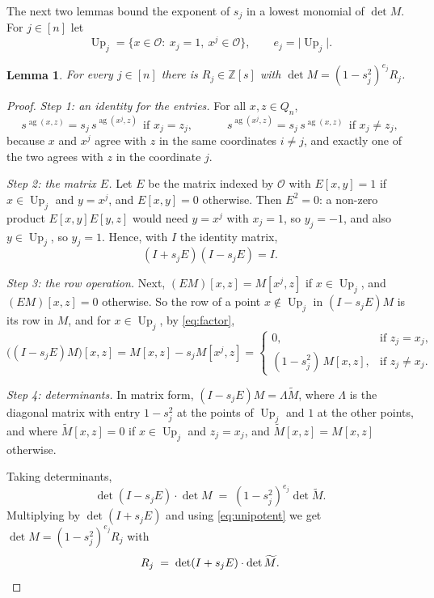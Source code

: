 \documentclass[11pt,reqno]{amsart}
\newtheorem{lemma}[theorem]{Lemma}
\theoremstyle{definition}
\theoremstyle{remark}
\numberwithin{equation}{section}
\theoremstyle{named}
\theoremstyle{plain}
\newcommand{\Z}{\mathbb{Z}}
\newcommand{\ag}{\operatorname{ag}}
\newcommand{\Up}{\operatorname{Up}}
\newcommand{\cO}{\mathcal{O}}
\newcommand{\abs}[1]{\lvert #1\rvert}
\begin{document}
The next two lemmas bound the exponent of $s_j$ in a lowest monomial of $\det M$. For $j\in[n]$ let
\[
   \Up_j=\{x\in\cO:\ x_j=1,\ x^{j}\in\cO\},\qquad e_j=\abs{\Up_j}.
\]

\begin{lemma}\label{lem:factor}
For every $j\in[n]$ there is $R_j\in\Z[s]$ with $\det M=(1-s_j^{2})^{e_j}R_j$.
\end{lemma}

\begin{proof}
\emph{Step 1: an identity for the entries.} For all $x,z\in Q_n$,
\begin{equation}\label{eq:factor}
   s^{\ag(x,z)}=s_j\,s^{\ag(x^{j},z)}\ \ \text{if }x_j=z_j,\qquad\quad
   s^{\ag(x^{j},z)}=s_j\,s^{\ag(x,z)}\ \ \text{if }x_j\ne z_j ,
\end{equation}
because $x$ and $x^{j}$ agree with $z$ in the same coordinates $i\ne j$, and exactly one of the two
agrees with $z$ in the coordinate $j$.

\smallskip
\emph{Step 2: the matrix $E$.} Let $E$ be the matrix indexed by $\cO$ with $E[x,y]=1$ if
$x\in\Up_j$ and $y=x^{j}$, and $E[x,y]=0$ otherwise. Then $E^{2}=0$: a non-zero product
$E[x,y]E[y,z]$ would need $y=x^{j}$ with $x_j=1$, so $y_j=-1$, and also $y\in\Up_j$, so $y_j=1$.
Hence, with $I$ the identity matrix,
\begin{equation}\label{eq:unipotent}
   (I+s_jE)(I-s_jE)=I .
\end{equation}

\smallskip
\emph{Step 3: the row operation.} Next, $(EM)[x,z]=M[x^{j},z]$ if $x\in\Up_j$, and $(EM)[x,z]=0$
otherwise. So the row of a point
$x\notin\Up_j$ in $(I-s_jE)M$ is its row in $M$, and for $x\in\Up_j$, by \eqref{eq:factor},
\[
   \bigl((I-s_jE)M\bigr)[x,z]=M[x,z]-s_jM[x^{j},z]=
   \begin{cases}0,& \text{if }z_j=x_j,\\[2pt] (1-s_j^{2})\,M[x,z],& \text{if }z_j\ne x_j.\end{cases}
\]

\smallskip
\emph{Step 4: determinants.} In matrix form, $(I-s_jE)M=\Lambda\widetilde M$, where $\Lambda$ is
the diagonal matrix with entry
$1-s_j^{2}$ at the points of $\Up_j$ and $1$ at the other points, and where $\widetilde M[x,z]=0$ if
$x\in\Up_j$ and $z_j=x_j$, and $\widetilde M[x,z]=M[x,z]$ otherwise.

Taking determinants,
\[
   \det(I-s_jE)\cdot\det M\;=\;(1-s_j^{2})^{e_j}\det\widetilde M .
\]
Multiplying by $\det(I+s_jE)$ and using
\eqref{eq:unipotent} we get $\det M=(1-s_j^{2})^{e_j}R_j$ with
\[
   R_j\;=\;\det(I+s_jE)\cdot\det\widetilde M . \qedhere
\]
\end{proof}
\end{document}
